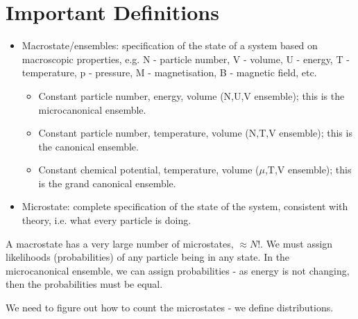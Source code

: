 \documentclass[a4paper, 11pt, normalem]{report}
\begin{document}
\section{Important Definitions}
\begin{itemize}
    \item Macrostate/ensembles: specification of the state of a system based on macroscopic properties, e.g. N - particle number, V - volume, U - energy, T - temperature, p - pressure, M - magnetisation, B - magnetic field, etc.
        \begin{itemize}
            \item Constant particle number, energy, volume (N,U,V ensemble); this is the microcanonical ensemble.
            \item Constant particle number, temperature, volume (N,T,V ensemble); this is the canonical ensemble.
            \item Constant chemical potential, temperature, volume ($\mu$,T,V ensemble); this is the grand canonical ensemble.
        \end{itemize}
    \item Microstate: complete specification of the state of the system, consistent with theory, i.e. what every particle is doing.
\end{itemize}
A macrostate has a very large number of microstates, $\approx N!$.
We must assign likelihoods (probabilities) of any particle being in any state. 
In the microcanonical ensemble, we can assign probabilities - as energy is not changing, then the probabilities must be equal. 

We need to figure out how to count the microstates - we define distributions. 
\end{document}
